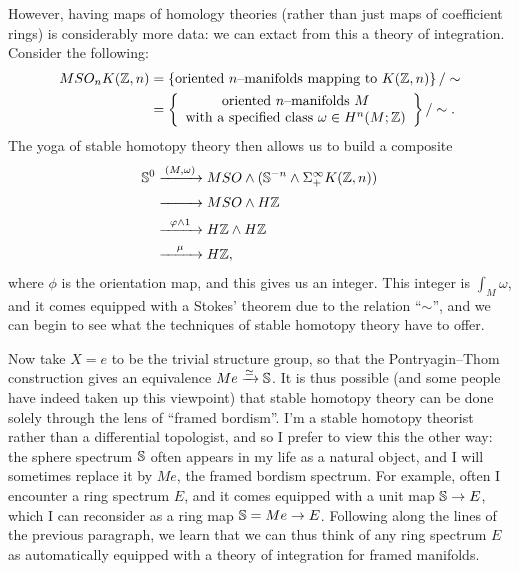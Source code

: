However, having maps of homology theories (rather than just maps of coefficient rings) is considerably more data: we can extact from this a theory of integration.  Consider the following:
\begin{align*}
MSO_n K(\Z, n) & = \left\{ \text{oriented $n$--manifolds mapping to $K(\Z, n)$} \right\} / \sim \\
& = \left\{ \begin{array}{c}\text{oriented $n$--manifolds $M$} \\ \text{with a specified class $\omega \in H^n(M; \Z)$} \end{array}\right\} / \sim.
\end{align*}
The yoga of stable homotopy theory then allows us to build a composite
\begin{align*}
\S^0 & \xrightarrow{\mathmakebox[2.5em]{(M, \omega)}} MSO \sm (\S^{-n} \sm \Susp^\infty_+ K(\Z, n)) \\ 
& \xrightarrow{\mathmakebox[2.5em]{\phantom{\phi}}} MSO \sm H\Z \\
& \xrightarrow{\mathmakebox[2.5em]{\phi \sm 1}} H\Z \sm H\Z \\
& \xrightarrow{\mathmakebox[2.5em]{\mu}} H\Z,
\end{align*}
where $\phi$ is the orientation map, and this gives us an integer. This integer is $\int_M \omega$, and it comes equipped with a Stokes' theorem due to the relation ``$\sim$'', and we can begin to see what the techniques of stable homotopy theory have to offer.

Now take $X = e$ to be the trivial structure group, so that the Pontryagin--Thom construction gives an equivalence $Me \xrightarrow{\simeq} \S$.  It is thus possible (and some people have indeed taken up this viewpoint) that stable homotopy theory can be done solely through the lens of ``framed bordism''. I'm a stable homotopy theorist rather than a differential topologist, and so I prefer to view this the other way: the sphere spectrum $\S$ often appears in my life as a natural object, and I will sometimes replace it by $Me$, the framed bordism spectrum.  For example, often I encounter a ring spectrum $E$, and it comes equipped with a unit map $\S \to E$, which I can reconsider as a ring map $\S = Me \to E$.  Following along the lines of the previous paragraph, we learn that we can thus think of any ring spectrum $E$ as automatically equipped with a theory of integration for framed manifolds.

